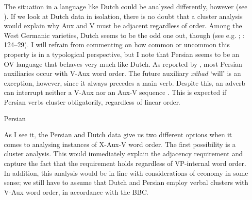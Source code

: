 \documentclass[output=paper, colorlinks, citecolor=brown]{langscibook}
\begin{document}
The situation in a language like Dutch could be analysed differently, however (see ). If we look at Dutch data in isolation, there is no doubt that a cluster analysis would explain why Aux and V must be adjacent regardless of order. Among the West Germanic varieties, Dutch seems to be the odd one out, though (see e.g. \citealt{Haegeman1992}; \citealt{Sapp2011}: 124–29). I will refrain from commenting on how common or uncommon this property is in a typological perspective, but I note that Persian seems to be an OV language that behaves very much like Dutch. As reported by \citet[100]{Sheehan2017Final}, most Persian auxiliaries occur with V-Aux word order. The future auxiliary \textit{xâhad} ‘will’ is an exception, however, since it always precedes a main verb. Despite this, an adverb can interrupt neither a V-Aux  nor an Aux-V sequence . This is expected if Persian verbs cluster obligatorily, regardless of linear order.

\ea Persian
\label{ex:sangfelt:32}

\z 
\z


As I see it, the Persian and Dutch data give us two different options when it comes to analysing instances of X-Aux-V word order. The first possibility is a cluster analysis. This would immediately explain the adjacency requirement and capture the fact that the requirement holds regardless of VP-internal word order. In addition, this analysis would be in line with considerations of economy in some sense; we still have to assume that Dutch and Persian employ verbal clusters with V-Aux word order, in accordance with the BBC. 
\end{document}
